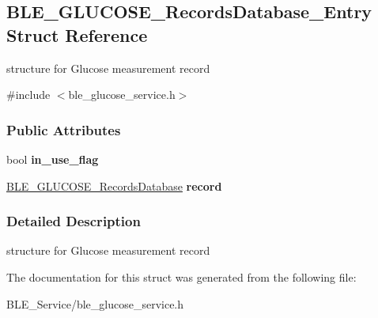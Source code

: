 \hypertarget{struct_b_l_e___g_l_u_c_o_s_e___records_database___entry}{}\subsection{B\+L\+E\+\_\+\+G\+L\+U\+C\+O\+S\+E\+\_\+\+Records\+Database\+\_\+\+Entry Struct Reference}
\label{struct_b_l_e___g_l_u_c_o_s_e___records_database___entry}


structure for Glucose measurement record  




{\ttfamily \#include $<$ble\+\_\+glucose\+\_\+service.\+h$>$}

\subsubsection*{Public Attributes}
\begin{DoxyCompactItemize}
\item 
bool {\bfseries in\+\_\+use\+\_\+flag}\hypertarget{struct_b_l_e___g_l_u_c_o_s_e___records_database___entry_af63048b4353cb77d05b07e609acf0e87}{}\label{struct_b_l_e___g_l_u_c_o_s_e___records_database___entry_af63048b4353cb77d05b07e609acf0e87}

\item 
\hyperlink{struct_b_l_e___g_l_u_c_o_s_e___records_database}{B\+L\+E\+\_\+\+G\+L\+U\+C\+O\+S\+E\+\_\+\+Records\+Database} {\bfseries record}\hypertarget{struct_b_l_e___g_l_u_c_o_s_e___records_database___entry_a1ec7e168074d1557d1b65c5f3acf4290}{}\label{struct_b_l_e___g_l_u_c_o_s_e___records_database___entry_a1ec7e168074d1557d1b65c5f3acf4290}

\end{DoxyCompactItemize}


\subsubsection{Detailed Description}
structure for Glucose measurement record 

The documentation for this struct was generated from the following file\+:\begin{DoxyCompactItemize}
\item 
B\+L\+E\+\_\+\+Service/ble\+\_\+glucose\+\_\+service.\+h\end{DoxyCompactItemize}
